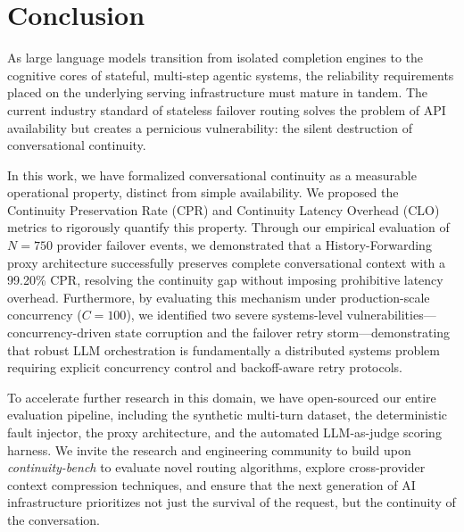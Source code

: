\section{Conclusion}
\label{sec:conclusion}

As large language models transition from isolated completion engines to the cognitive cores of stateful, multi-step agentic systems, the reliability requirements placed on the underlying serving infrastructure must mature in tandem. The current industry standard of stateless failover routing solves the problem of API availability but creates a pernicious vulnerability: the silent destruction of conversational continuity. 

In this work, we have formalized conversational continuity as a measurable operational property, distinct from simple availability. We proposed the Continuity Preservation Rate (CPR) and Continuity Latency Overhead (CLO) metrics to rigorously quantify this property. Through our empirical evaluation of $N=750$ provider failover events, we demonstrated that a History-Forwarding proxy architecture successfully preserves complete conversational context with a 99.20\% CPR, resolving the continuity gap without imposing prohibitive latency overhead. Furthermore, by evaluating this mechanism under production-scale concurrency ($C=100$), we identified two severe systems-level vulnerabilities---concurrency-driven state corruption and the failover retry storm---demonstrating that robust LLM orchestration is fundamentally a distributed systems problem requiring explicit concurrency control and backoff-aware retry protocols.

To accelerate further research in this domain, we have open-sourced our entire evaluation pipeline, including the synthetic multi-turn dataset, the deterministic fault injector, the proxy architecture, and the automated LLM-as-judge scoring harness. We invite the research and engineering community to build upon \textit{continuity-bench} to evaluate novel routing algorithms, explore cross-provider context compression techniques, and ensure that the next generation of AI infrastructure prioritizes not just the survival of the request, but the continuity of the conversation.
